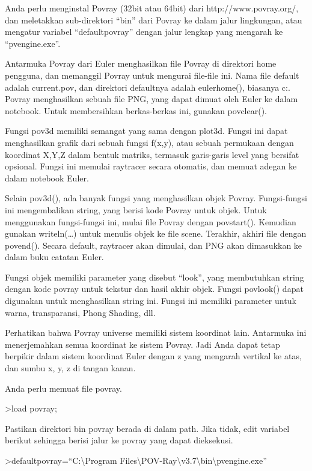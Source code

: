 \documentclass[
]{book}
\begin{document}
Anda perlu menginstal Povray (32bit atau 64bit) dari http://www.povray.org/, dan meletakkan sub-direktori ``bin'' dari Povray ke dalam jalur lingkungan, atau mengatur variabel ``defaultpovray'' dengan jalur lengkap yang mengarah ke ``pvengine.exe''.

Antarmuka Povray dari Euler menghasilkan file Povray di direktori home pengguna, dan memanggil Povray untuk mengurai file-file ini. Nama file default adalah current.pov, dan direktori defaultnya adalah eulerhome(), biasanya c:\Users\Username\Euler. Povray menghasilkan sebuah file PNG, yang dapat dimuat oleh Euler ke dalam notebook. Untuk membersihkan berkas-berkas ini, gunakan povclear().

Fungsi pov3d memiliki semangat yang sama dengan plot3d. Fungsi ini dapat menghasilkan grafik dari sebuah fungsi f(x,y), atau sebuah permukaan dengan koordinat X,Y,Z dalam bentuk matriks, termasuk garis-garis level yang bersifat opsional. Fungsi ini memulai raytracer secara otomatis, dan memuat adegan ke dalam notebook Euler.

Selain pov3d(), ada banyak fungsi yang menghasilkan objek Povray. Fungsi-fungsi ini mengembalikan string, yang berisi kode Povray untuk objek. Untuk menggunakan fungsi-fungsi ini, mulai file Povray dengan povstart(). Kemudian gunakan writeln(\ldots) untuk menulis objek ke file scene. Terakhir, akhiri file dengan povend(). Secara default, raytracer akan dimulai, dan PNG akan dimasukkan ke dalam buku catatan Euler.

Fungsi objek memiliki parameter yang disebut ``look'', yang membutuhkan string dengan kode povray untuk tekstur dan hasil akhir objek. Fungsi povlook() dapat digunakan untuk menghasilkan string ini. Fungsi ini memiliki parameter untuk warna, transparansi, Phong Shading, dll.

Perhatikan bahwa Povray universe memiliki sistem koordinat lain. Antarmuka ini menerjemahkan semua koordinat ke sistem Povray. Jadi Anda dapat tetap berpikir dalam sistem koordinat Euler dengan z yang mengarah vertikal ke atas, dan sumbu x, y, z di tangan kanan.

Anda perlu memuat file povray.

\textgreater load povray;

Pastikan direktori bin povray berada di dalam path. Jika tidak, edit variabel berikut sehingga berisi jalur ke povray yang dapat dieksekusi.

\textgreater defaultpovray=``C:\textbackslash Program Files\textbackslash POV-Ray\textbackslash v3.7\textbackslash bin\textbackslash pvengine.exe''
\end{document}
